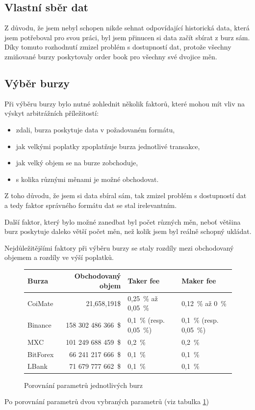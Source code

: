 \documentclass[thesis=B,czech]{FITthesis}[2019/03/21]
\begin{document}
\subsection{Vlastní sběr dat}
Z důvodu, že jsem nebyl schopen nikde sehnat odpovídající historická data, která jsem potřeboval pro svou práci, byl jsem přinucen si data začít sbírat z burz sám. Díky tomuto rozhodnutí zmizel problém s dostupností dat, protože všechny zmiňované burzy poskytovaly order book pro všechny své dvojice měn.

\subsection{Výběr burzy}
Při výběru burzy bylo nutné zohlednit několik faktorů, které mohou mít vliv na výskyt arbitrážních příležitostí: 
\begin{itemize}
    \item zdali, burza poskytuje data v požadovaném formátu,
    \item jak velkými poplatky zpoplatňuje burza jednotlivé transakce,
    \item jak velký objem se na burze zobchoduje,
    \item s kolika různými měnami je možné obchodovat.
\end{itemize}
Z toho důvodu, že jsem si data sbíral sám, tak zmizel problém s dostupností dat a tedy faktor správného formátu dat se stal irelevantním.

Další faktor, který bylo možné zanedbat byl počet různých měn, neboť většina burz poskytuje daleko větší počet měn, než kolik jsem byl reálně schopný ukládat. 

Nejdůležitějšími faktory při výběru burzy se staly rozdíly mezi obchodovaný objemem a rozdíly ve výší poplatků.

\begin{figure}\centering
    \begin{center}
     \begin{tabular}{||l | r | l | l||} 
     \hline
     Burza & Obchodovaný objem & Taker fee & Maker fee \\ [0.5ex]
     \hline\hline
     CoiMate & 21,658,191\$ & 0,25~\% až 0,05~\% & 0,12~\% až 0~\%  \\ 
     \hline
     Binance & 158 302 486 366~\$ & 0,1~\% (resp. 0,05~\%) & 0,1~\% (resp. 0,05~\%)  \\ 
     \hline
     MXC & 101 249 688 459~\$ & 0,2~\% & 0,2~\%  \\ 
     \hline
     BitForex & 66 241 217 666~\$ & 0,1~\% & 0,1~\%  \\ 
     \hline
     LBank & 71 679 777 662~\$ & 0,1~\% & 0,1~\%  \\ 
     \hline
    \end{tabular}
    \end{center}
    \caption{Porovnání parametrů jednotlivých burz}
    \label{exchanges_comparison}
\end{figure}
Po porovnání parametrů dvou vybraných parametrů (viz tabulka \ref{exchanges_comparison})
\end{document}
